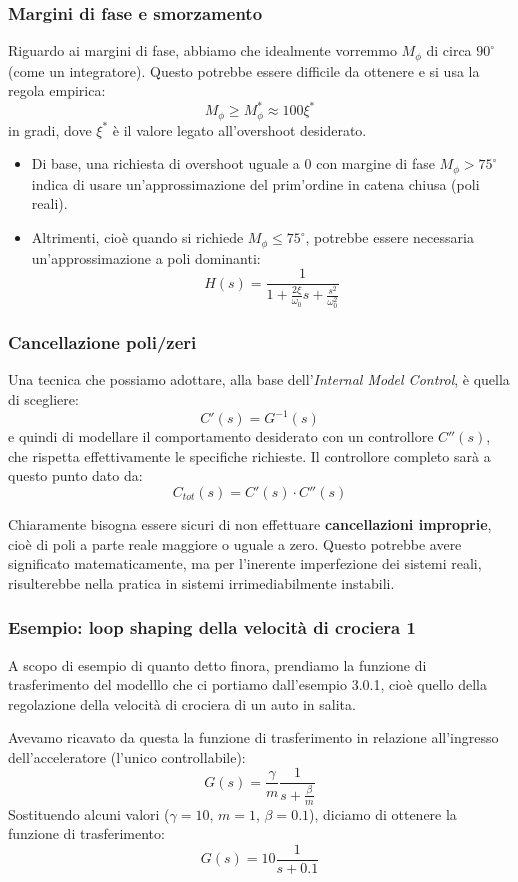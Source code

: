 \documentclass[a4paper,11pt]{article}
\begin{document}
\subsubsection{Margini di fase e smorzamento}
Riguardo ai margini di fase, abbiamo che idealmente vorremmo $M_\phi$ di circa $90^\circ$ (come un integratore).
Questo potrebbe essere difficile da ottenere e si usa la regola empirica:
$$
M_\phi \geq M_\phi^* \approx 100 \xi^*
$$
in gradi, dove $\xi^*$ è il valore legato all'overshoot desiderato. 

\begin{itemize}
	\item Di base, una richiesta di overshoot uguale a 0 con margine di fase $M_\phi > 75^\circ$ indica di usare un'approssimazione del prim'ordine in catena chiusa (poli reali).
	\item Altrimenti, cioè quando si richiede $M_\phi \leq 75^\circ$, potrebbe essere necessaria un'approssimazione a poli dominanti:
		$$
		H(s) = \frac{1}{1 + \frac{2\xi}{\omega_0} s + \frac{s^2}{\omega_0^2}}
		$$
\end{itemize}

\subsubsection{Cancellazione poli/zeri}
Una tecnica che possiamo adottare, alla base dell'\textit{Internal Model Control}, è quella di scegliere:
$$
C'(s) = G^{-1}(s)
$$
e quindi di modellare il comportamento desiderato con un controllore $C''(s)$, che rispetta effettivamente le specifiche richieste.
Il controllore completo sarà a questo punto dato da:
$$
C_{tot}(s) = C'(s) \cdot C''(s)
$$

Chiaramente bisogna essere sicuri di non effettuare \textbf{cancellazioni improprie}, cioè di poli a parte reale maggiore o uguale a zero.
Questo potrebbe avere significato matematicamente, ma per l'inerente imperfezione dei sistemi reali, risulterebbe nella pratica in sistemi irrimediabilmente instabili.

\subsubsection{Esempio: loop shaping della velocità di crociera 1}
A scopo di esempio di quanto detto finora, prendiamo la funzione di trasferimento del modelllo che ci portiamo dall'esempio 3.0.1, cioè quello della regolazione della velocità di crociera di un auto in salita.

Avevamo ricavato da questa la funzione di trasferimento in relazione all'ingresso dell'acceleratore (l'unico controllabile):
$$
G(s) = \frac{\gamma}{m} \frac{1}{s + \frac{\beta}{m}} 
$$
Sostituendo alcuni valori ($\gamma = 10$, $m = 1$, $\beta = 0.1$), diciamo di ottenere la funzione di trasferimento:
$$
G(s) = 10 \frac{1}{s + 0.1}
$$
\end{document}
